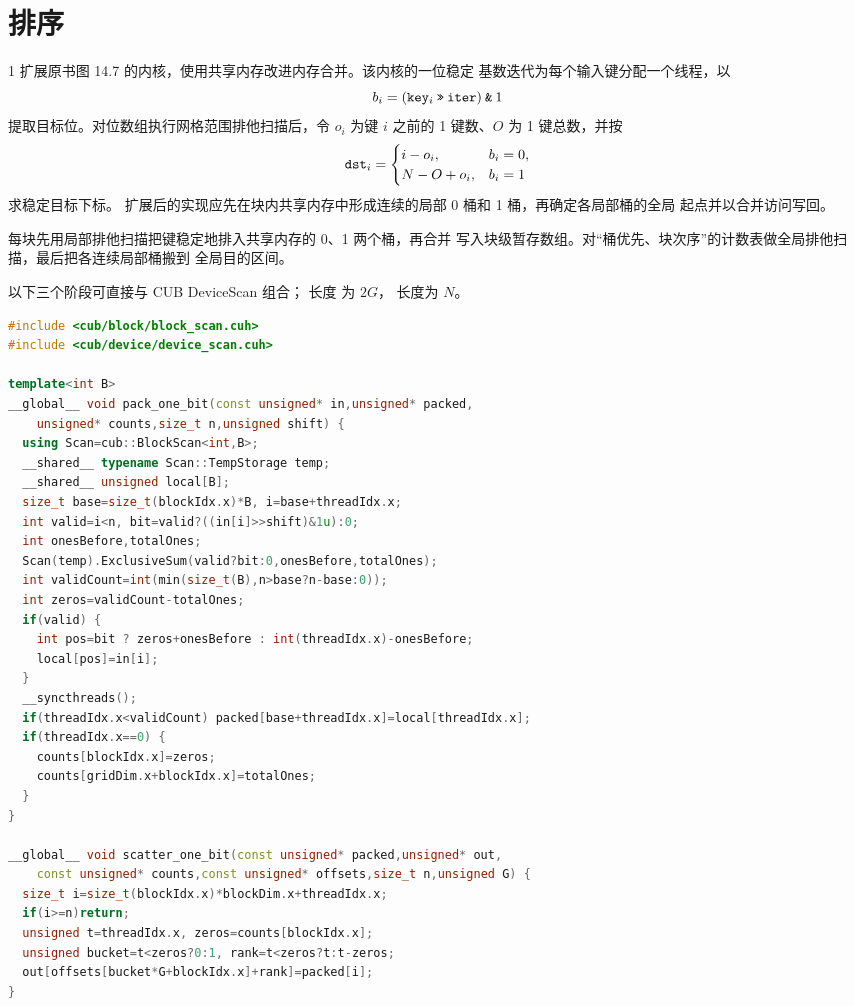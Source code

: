 \chapter{排序}

\begin{solutionexercise}{1}
\problemheading 扩展原书图 14.7 的内核，使用共享内存改进内存合并。该内核的一位稳定
基数迭代为每个输入键分配一个线程，以
\[
  b_i=(\code{key}_i\mathbin{\texttt{>>}}\code{iter})\mathbin{\texttt{\&}}1
\]
提取目标位。对位数组执行网格范围排他扫描后，令 $o_i$ 为键 $i$ 之前的 1 键数、$O$
为 1 键总数，并按
\[
  \code{dst}_i=\begin{cases}i-o_i,&b_i=0,\\N-O+o_i,&b_i=1\end{cases}
\]
求稳定目标下标。
扩展后的实现应先在块内共享内存中形成连续的局部 0 桶和 1 桶，再确定各局部桶的全局
起点并以合并访问写回。

\approachheading 每块先用局部排他扫描把键稳定地排入共享内存的 0、1 两个桶，再合并
写入块级暂存数组。对“桶优先、块次序”的计数表做全局排他扫描，最后把各连续局部桶搬到
全局目的区间。

\answerheading 以下三个阶段可直接与 CUB DeviceScan 组合； 长度
为 $2G$， 长度为 $N$。
\begin{lstlisting}[language=C++]
#include <cub/block/block_scan.cuh>
#include <cub/device/device_scan.cuh>

template<int B>
__global__ void pack_one_bit(const unsigned* in,unsigned* packed,
    unsigned* counts,size_t n,unsigned shift) {
  using Scan=cub::BlockScan<int,B>;
  __shared__ typename Scan::TempStorage temp;
  __shared__ unsigned local[B];
  size_t base=size_t(blockIdx.x)*B, i=base+threadIdx.x;
  int valid=i<n, bit=valid?((in[i]>>shift)&1u):0;
  int onesBefore,totalOnes;
  Scan(temp).ExclusiveSum(valid?bit:0,onesBefore,totalOnes);
  int validCount=int(min(size_t(B),n>base?n-base:0));
  int zeros=validCount-totalOnes;
  if(valid) {
    int pos=bit ? zeros+onesBefore : int(threadIdx.x)-onesBefore;
    local[pos]=in[i];
  }
  __syncthreads();
  if(threadIdx.x<validCount) packed[base+threadIdx.x]=local[threadIdx.x];
  if(threadIdx.x==0) {
    counts[blockIdx.x]=zeros;
    counts[gridDim.x+blockIdx.x]=totalOnes;
  }
}

__global__ void scatter_one_bit(const unsigned* packed,unsigned* out,
    const unsigned* counts,const unsigned* offsets,size_t n,unsigned G) {
  size_t i=size_t(blockIdx.x)*blockDim.x+threadIdx.x;
  if(i>=n)return;
  unsigned t=threadIdx.x, zeros=counts[blockIdx.x];
  unsigned bucket=t<zeros?0:1, rank=t<zeros?t:t-zeros;
  out[offsets[bucket*G+blockIdx.x]+rank]=packed[i];
}


\end{lstlisting}
\end{solutionexercise}
